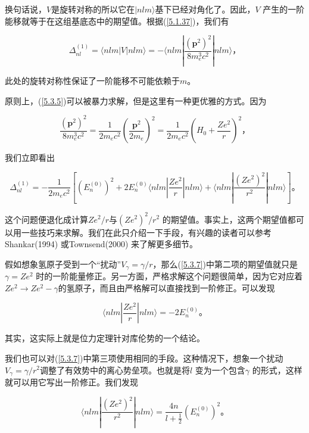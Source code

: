 ﻿\documentclass[UTF8,twoside]{ctexart}
\begin{document}
\noindent 换句话说，$V$是旋转对称的所以它在$|nlm\rangle$基下已经对角化了。因此，$V$ 产生的一阶能移就等于在这组基底态中的期望值。根据(\ref{5.1.37})，我们有

\begin{equation} \label{5.3.5}
\Delta_{nl}^{(1)}=\langle nlm|V|nlm\rangle = -\langle nlm|\dfrac{(\boldsymbol{p}^2)^2}{8m_e^3c^2}|nlm\rangle\text{，}
\end{equation}

\noindent 此处的旋转对称性保证了一阶能移不可能依赖于$m$。

原则上，(\ref{5.3.5})可以被暴力求解，但是这里有一种更优雅的方式。因为

\begin{equation} \label{5.3.6}
\dfrac{(\boldsymbol{p}^2)^2}{8m_e^3c^2}=\dfrac{1}{2m_ec^2} \left(\dfrac{\boldsymbol{p}^2}{2m_e}\right)^2 =\dfrac{1}{2m_ec^2}\left(H_0+\dfrac{Ze^2}{r}\right)^2\text{，}
\end{equation}

\noindent 我们立即看出

\begin{equation} \label{5.3.7}
\Delta_{nl}^{(1)}=-\dfrac{1}{2m_ec^2}\left[\left(E_n^{(0)}\right)^2+2E_n^{(0)}\langle nlm|\dfrac{Ze^2}{r}|nlm\rangle+\langle nlm|\dfrac{(Ze^2)^2}{r^2}|nlm\rangle\right]\text{。}
\end{equation}

\noindent 这个问题便退化成计算$Ze^2/r$与$(Ze^2)^2/r^2$ 的期望值。事实上，这两个期望值都可以用一些技巧来求解。我们在此只介绍一下手段，有兴趣的读者可以参考Shankar(1994) 或Townsend(2000) 来了解更多细节。

假如想象氢原子受到一个“扰动”$V_\gamma=\gamma/r$，那么(\ref{5.3.7})中第二项的期望值就只是$\gamma=Ze^2$ 时的一阶能量修正。另一方面，严格求解这个问题很简单，因为它对应着$Ze^2\rightarrow Ze^2-\gamma$的氢原子，而且由严格解可以直接找到一阶修正。可以发现

\begin{equation} \label{5.3.8}
\langle nlm|\dfrac{Ze^2}{r}|nlm\rangle = -2E_n^{(0)}\text{。}
\end{equation}

\noindent 其实，这实际上就是位力定理针对库伦势的一个结论。

我们也可以对(\ref{5.3.7})中第三项使用相同的手段。这种情况下，想象一个扰动$V_\gamma=\gamma/r^2$调整了有效势中的离心势垒项。也就是将$l$ 变为一个包含$\gamma$ 的形式，这样就可以用它写出一阶修正。我们发现

\begin{equation} \label{5.3.9}
\langle nlm|\dfrac{(Ze^2)^2}{r^2}|nlm\rangle = \dfrac{4n}{l+\frac{1}{2}}\left(E_n^{(0)}\right)^2\text{。}
\end{equation}
\end{document}
